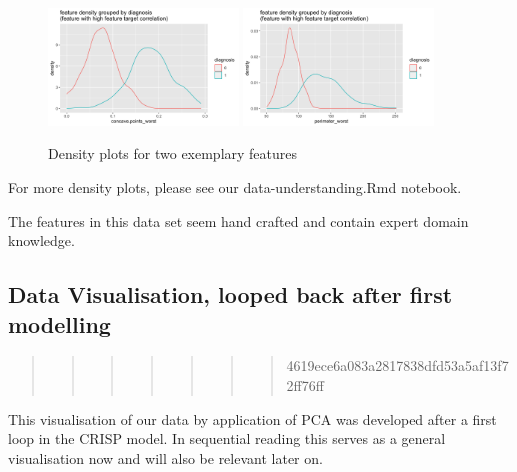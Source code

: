 \documentclass[]{article}
\begin{document}
\begin{figure}
    \centering
    \includegraphics[width=0.45\textwidth]{images/density2.png}
    \includegraphics[width=0.45\textwidth]{images/density3.png}
    \caption{Density plots for two exemplary features}
    \label{fig:densities}
\end{figure}

For more density plots, please see our data-understanding.Rmd notebook.

The features in this data set seem hand crafted and contain expert
domain knowledge.

\subsection{Data Visualisation, looped back after first
modelling}\label{data-visualisation-looped-back-after-first-modelling}

\begin{quote}
\begin{quote}
\begin{quote}
\begin{quote}
\begin{quote}
\begin{quote}
\begin{quote}
4619ece6a083a2817838dfd53a5af13f72ff76ff
\end{quote}
\end{quote}
\end{quote}
\end{quote}
\end{quote}
\end{quote}
\end{quote}

This visualisation of our data by application of PCA was developed after
a first loop in the CRISP model. In sequential reading this serves as a
general visualisation now and will also be relevant later on.
\end{document}
